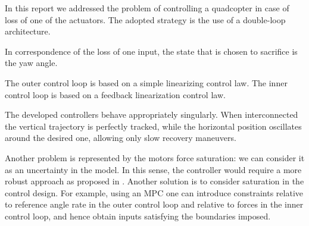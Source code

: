 \documentclass[11pt,a4paper]{scrartcl}
\begin{document}
In this report we addressed the problem of controlling a quadcopter in case of loss of one of the actuators. The adopted strategy is the use of a double-loop architecture. 

In correspondence of the loss of one input, the state that is chosen to sacrifice is the yaw angle.

The outer control loop is based on a simple linearizing control law. The inner control loop is based on a feedback linearization control law. 

The developed controllers behave appropriately singularly. When interconnected the vertical trajectory is perfectly tracked, while the horizontal position oscillates around the desired one, allowing only slow recovery maneuvers.

Another problem is represented by the motors force saturation: we can consider it as an uncertainty in the model. In this sense, the controller would require a more robust approach as proposed in \cite{lanzon2014flight}. Another solution is to consider saturation in the control design. For example, using an MPC one can introduce constraints relative to reference angle rate in the outer control loop and relative to forces in the inner control loop, and hence obtain inputs satisfying the boundaries imposed.

\clearpage




\end{document}
